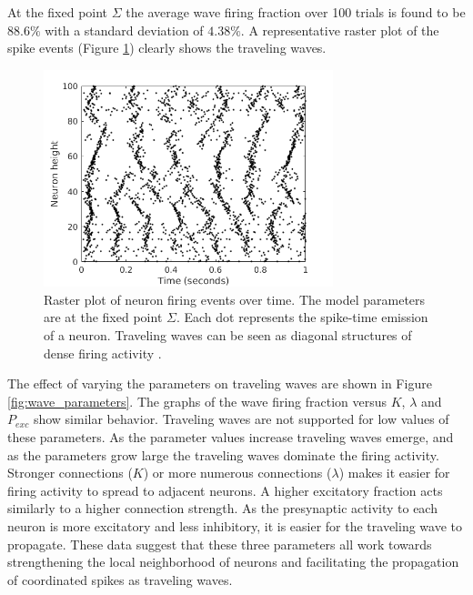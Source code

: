 \documentclass[12pt]{article}
\begin{document}
At the fixed point $\Sigma$ the average wave firing fraction over 100 trials is found to be $88.6\%$ with a standard deviation of $4.38\%$.
A representative raster plot of the spike events (Figure \ref{fig:sigma_raster}) clearly shows the traveling waves.
\begin{figure}[!htb]
 \centering
 \includegraphics[width=0.75\textwidth]{fig/baseline}
 \caption{Raster plot of neuron firing events over time. The model parameters are at the fixed point $\Sigma$. Each dot represents the spike-time emission of a neuron. Traveling waves can be seen as diagonal structures of dense firing activity \parencite{Senk2018}. }
 \label{fig:sigma_raster}
\end{figure}

The effect of varying the parameters on traveling waves are shown in Figure \ref{fig:wave_parameters}.
The graphs of the wave firing fraction versus $K$, $\lambda$ and $P_{exc}$ show similar behavior.
Traveling waves are not supported for low values of these parameters.
As the parameter values increase traveling waves emerge, and as the parameters grow large the traveling waves dominate the firing activity.
Stronger connections ($K$) or more numerous connections ($\lambda$) makes it easier for firing activity to spread to adjacent neurons.
A higher excitatory fraction acts similarly to a higher connection strength. 
As the presynaptic activity to each neuron is more excitatory and less inhibitory, it is easier for the traveling wave to propagate.
These data suggest that these three parameters all work towards strengthening the local neighborhood of neurons and facilitating the propagation of coordinated spikes as traveling waves.
\end{document}
